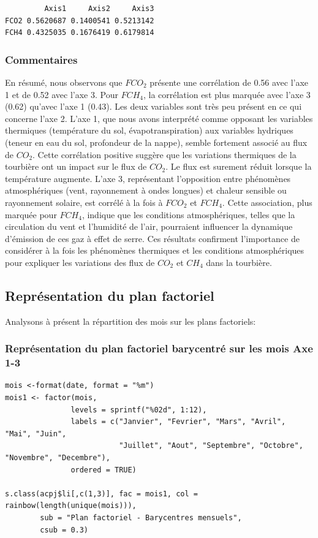 \documentclass[a4paper,12pt]{report}%
\begin{document}
\begin{lstlisting}
         Axis1     Axis2     Axis3
FCO2 0.5620687 0.1400541 0.5213142
FCH4 0.4325035 0.1676419 0.6179814
\end{lstlisting}

\subsubsection{Commentaires}

En résumé, nous observons que $FCO_2$ présente une corrélation de 0.56 avec l’axe 1 et de 0.52 avec l’axe 3. Pour $FCH_4$, la corrélation est plus marquée avec l’axe 3 (0.62) qu’avec l’axe 1 (0.43). Les deux variables sont très peu présent en ce qui concerne l'axe 2.
L’axe 1, que nous avons interprété comme opposant les variables thermiques (température du sol, évapotranspiration) aux variables hydriques (teneur en eau du sol, profondeur de la nappe), semble fortement associé au flux de $CO_2$. Cette corrélation positive suggère que les variations thermiques de la tourbière ont un impact sur le flux de $CO_2$. Le flux est surement réduit  lorsque la température augmente. \newline
L’axe 3, représentant l’opposition entre phénomènes atmosphériques (vent, rayonnement à ondes longues) et chaleur sensible ou rayonnement solaire, est corrélé à la fois à $FCO_2$ et $FCH_4$. Cette association, plus marquée pour $FCH_4$, indique que les conditions atmosphériques, telles que la circulation du vent et l’humidité de l’air, pourraient influencer la dynamique d’émission de ces gaz à effet de serre. \newline
Ces résultats confirment l’importance de considérer à la fois les phénomènes thermiques et les conditions atmosphériques pour expliquer les variations des flux de $CO_2$ et $CH_4$ dans la tourbière.

\subsection{Représentation du plan factoriel}

Analysons à présent la répartition des mois sur les plans factoriels:

\subsubsection{Représentation du plan factoriel barycentré sur les mois Axe 1-3}

\begin{lstlisting}
mois <-format(date, format = "%m")
mois1 <- factor(mois, 
               levels = sprintf("%02d", 1:12),
               labels = c("Janvier", "Fevrier", "Mars", "Avril", "Mai", "Juin",
                          "Juillet", "Aout", "Septembre", "Octobre", "Novembre", "Decembre"),
               ordered = TRUE)

s.class(acpj$li[,c(1,3)], fac = mois1, col = rainbow(length(unique(mois))), 
        sub = "Plan factoriel - Barycentres mensuels", 
        csub = 0.3)
\end{lstlisting}
\end{document}
